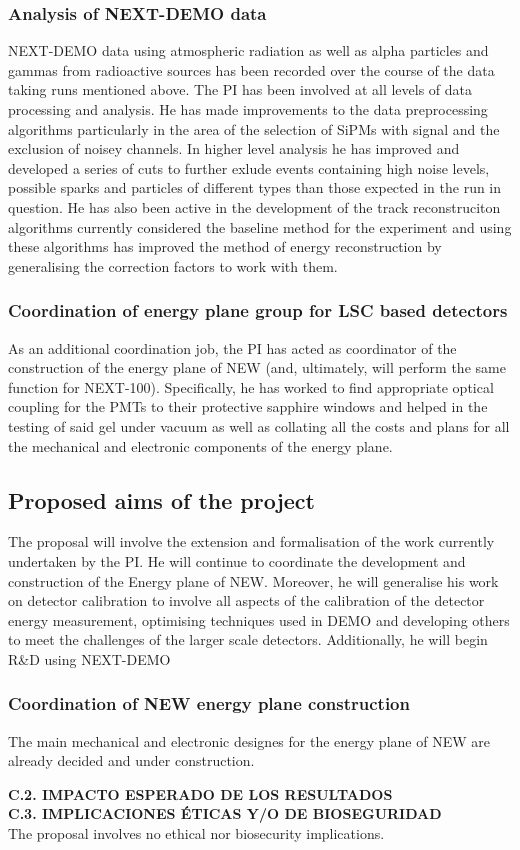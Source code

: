 \documentclass[a4paper,11pt,oneside]{article}
\begin{document}
\subsubsection*{Analysis of NEXT-DEMO data}
NEXT-DEMO data using atmospheric radiation as well as alpha particles and gammas from radioactive sources has been recorded over the course of the data taking runs mentioned above. The PI has been involved at all levels of data processing and analysis. He has made improvements to the data preprocessing algorithms particularly in the area of the selection of SiPMs with signal and the exclusion of noisey channels. In higher level analysis he has improved and developed a series of cuts to further exlude events containing high noise levels, possible sparks and particles of different types than those expected in the run in question. He has also been active in the development of the track reconstruciton algorithms currently considered the baseline method for the experiment and using these algorithms has improved the method of energy reconstruction by generalising the correction factors to work with them.

\subsubsection*{Coordination of energy plane group for LSC based detectors}
As an additional coordination job, the PI has acted as coordinator of
the construction of the energy plane of NEW (and, ultimately, will
perform the same function for NEXT-100). Specifically, he has worked
to find appropriate optical coupling for the PMTs to their protective
sapphire windows and helped in the testing of said gel under vacuum as
well as collating all the costs and plans for all the mechanical and
electronic components of the energy plane.

\subsection*{Proposed aims of the project}
\label{subSec:Prop}
The proposal will involve the extension and formalisation of the work
currently undertaken by the PI. He will continue to coordinate the
development and construction of the Energy plane of NEW. Moreover, he will
generalise his work on detector calibration to involve all aspects of
the calibration of the detector energy measurement, optimising
techniques used in DEMO and developing others to meet the challenges
of the larger scale detectors. Additionally, he will begin R\&D using NEXT-DEMO

\subsubsection*{Coordination of NEW energy plane construction}
The main mechanical and electronic designes for the energy plane of
NEW are already decided and under construction. 

\noindent\textbf{C.2. IMPACTO ESPERADO DE LOS RESULTADOS}\\


\noindent\textbf{C.3. IMPLICACIONES \'ETICAS Y/O DE BIOSEGURIDAD}\\
The proposal involves no ethical nor biosecurity implications.
\end{document}
